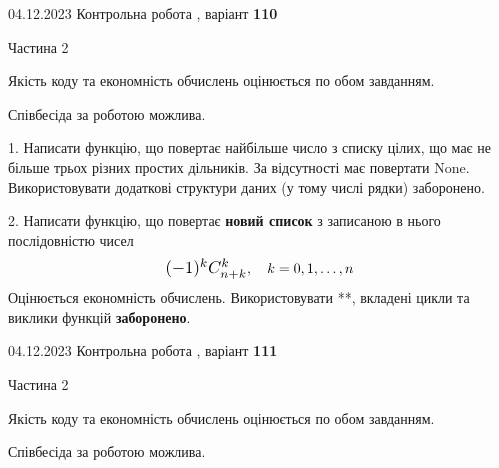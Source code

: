 \documentclass[12pt, ukrainian]{article}
\begin{document}
{{{{{{{{{\begin {Large}
\end{Large}\newpage




\begin {Huge}
{{04.12.2023 Контрольна робота , варіант  \No \textbf { 110 }\par}}

\begin{center}Частина 2
\end{center}
\vspace{10mm}
\end {Huge}

{
\begin {Large}
Якість коду та економність обчислень оцінюється по обом завданням.

Співбесіда за роботою можлива.

\vspace{5mm}

1. Написати функцію, що повертає найбільше число з списку цілих, що має не більше трьох різних простих дільників. За відсутності має повертати None. Використовувати додаткові структури даних (у тому числі рядки) заборонено.

\vspace{10mm}



2. 
Написати функцію, що повертає \textbf{новий список} з записаною в нього послідовністю чисел
$$\scalebox{1.2}{$(-1)^{k}C_{n+k}^{k}$}, \quad k=0,1,\ldots,n$$
Оцінюється економність обчислень. Використовувати **, вкладені цикли та виклики функцій \textbf{заборонено}.

\end{Large}\newpage




\begin {Huge}
{{04.12.2023 Контрольна робота , варіант  \No \textbf { 111 }\par}}

\begin{center}Частина 2
\end{center}
\vspace{10mm}
\end {Huge}

{
\begin {Large}
Якість коду та економність обчислень оцінюється по обом завданням.

Співбесіда за роботою можлива.


\end{Large}}}}}}}}}}}}
\end{document}
